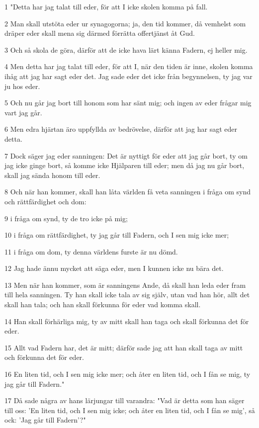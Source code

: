 \par 1 "Detta har jag talat till eder, för att I icke skolen komma på fall.
\par 2 Man skall utstöta eder ur synagogorna; ja, den tid kommer, då vemhelst som dräper eder skall mena sig därmed förrätta offertjänst åt Gud.
\par 3 Och så skola de göra, därför att de icke hava lärt känna Fadern, ej heller mig.
\par 4 Men detta har jag talat till eder, för att I, när den tiden är inne, skolen komma ihåg att jag har sagt eder det. Jag sade eder det icke från begynnelsen, ty jag var ju hos eder.
\par 5 Och nu går jag bort till honom som har sänt mig; och ingen av eder frågar mig vart jag går.
\par 6 Men edra hjärtan äro uppfyllda av bedrövelse, därför att jag har sagt eder detta.
\par 7 Dock säger jag eder sanningen: Det är nyttigt för eder att jag går bort, ty om jag icke ginge bort, så komme icke Hjälparen till eder; men då jag nu går bort, skall jag sända honom till eder.
\par 8 Och när han kommer, skall han låta världen få veta sanningen i fråga om synd och rättfärdighet och dom:
\par 9 i fråga om synd, ty de tro icke på mig;
\par 10 i fråga om rättfärdighet, ty jag går till Fadern, och I sen mig icke mer;
\par 11 i fråga om dom, ty denna världens furste är nu dömd.
\par 12 Jag hade ännu mycket att säga eder, men I kunnen icke nu bära det.
\par 13 Men när han kommer, som är sanningens Ande, då skall han leda eder fram till hela sanningen. Ty han skall icke tala av sig själv, utan vad han hör, allt det skall han tala; och han skall förkunna för eder vad komma skall.
\par 14 Han skall förhärliga mig, ty av mitt skall han taga och skall förkunna det för eder.
\par 15 Allt vad Fadern har, det är mitt; därför sade jag att han skall taga av mitt och förkunna det för eder.
\par 16 En liten tid, och I sen mig icke mer; och åter en liten tid, och I fån se mig, ty jag går till Fadern."
\par 17 Då sade några av hans lärjungar till varandra: "Vad är detta som han säger till oss: 'En liten tid, och I sen mig icke; och åter en liten tid, och I fån se mig', så ock: 'Jag går till Fadern'?"

